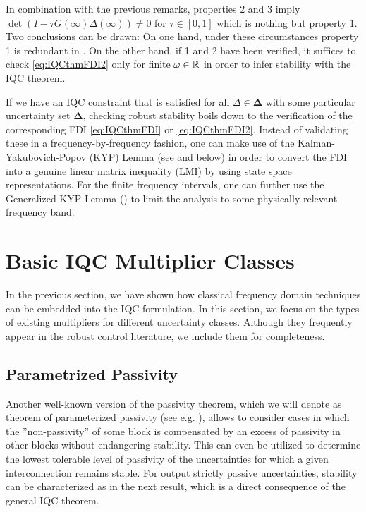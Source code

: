 \begin{rem}\label{rem:iqc3}
In combination with the previous remarks, properties 2 and 3 imply
$\det(I-\tau G(\infty)\Delta(\infty))\neq 0$ for $\tau\in[0,1]$
which is nothing but property 1.
Two conclusions can be drawn: On one hand, under these circumstances property 1 is redundant in . On the other 
hand, if 1 and 2 have been verified, it suffices to check \eqref{eq:IQCthmFDI2} only for finite 
$\omega\in\mathbb{R}$ in order to infer stability with the IQC theorem.
\end{rem}


If we have an IQC constraint that is satisfied for all $\Delta\in\bm{\Delta}$ with some particular uncertainty 
set $\bm{\Delta}$, checking robust stability boils down to the verification of the corresponding FDI \eqref{eq:IQCthmFDI} 
or \eqref{eq:IQCthmFDI2}. Instead of validating these in a frequency-by-frequency fashion, one can make use of 
the Kalman-Yakubovich-Popov (KYP) Lemma (see \cite{rantzerkyp} and below) in order to convert the FDI into 
a genuine linear matrix inequality (LMI) by using state space representations. For the finite frequency intervals, 
one can further use the Generalized KYP Lemma (\cite{genelKYP}) to limit the analysis to some physically relevant frequency band.

\section{Basic IQC Multiplier Classes}
In the previous section, we have shown how classical frequency domain techniques can be embedded into the IQC formulation. 
In this section, we focus on the types of existing multipliers for different uncertainty classes. Although they frequently 
appear in the robust control literature, we include them for completeness.


\subsection{Parametrized Passivity}\label{sec:osppass}
Another well-known version of the passivity theorem, {which we will denote as} theorem of parameterized passivity (see e.g. 
\cite[Thm. VI.5.10]{desvid}), allows to consider cases in which the ''non-passivity'' of some block is compensated by an 
excess of passivity in other blocks without endangering stability. This can even be utilized to determine the lowest 
tolerable level of passivity of the uncertainties for which a given interconnection remains stable. For output strictly passive 
uncertainties, stability can be characterized as in the next result, which is a direct consequence of the general IQC theorem.

